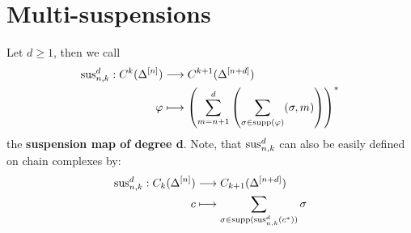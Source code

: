 \section{Multi-suspensions}

\begin{defi}
Let \(d\geq 1\), then we call
\begin{align}
\mathrm{sus}_{n,k}^d:C^k(\Delta^{[n]})&\longrightarrow C^{k+1}(\Delta^{[n+d]})\notag\\
\varphi&\longmapsto\left(\sum\limits_{m=n+1}^d\left(\sum\limits_{\sigma\in \mathrm{supp}(\varphi)}(\sigma,m)\right)\right)^*\notag
\end{align}
the \textbf{suspension map of degree d}. Note, that \(\mathrm{sus}_{n,k}^d\) can also be easily defined on chain complexes by:
\begin{align}
\mathrm{sus}_{n,k}^d:C_k(\Delta^{[n]})&\longrightarrow C_{k+1}(\Delta^{[n+d]})\notag\\
c&\longmapsto\sum\limits_{\sigma\in \mathrm{supp}(\mathrm{sus}_{n,k}^d(c^*))}\sigma\notag
\end{align}
\end{defi}

